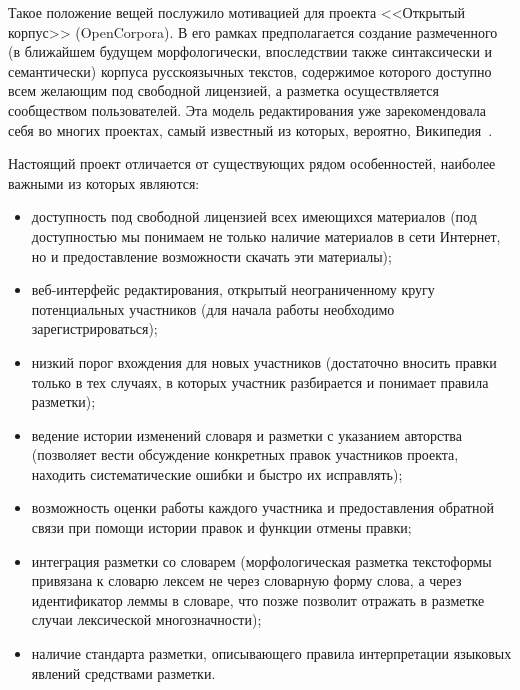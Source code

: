 \documentclass[a4paper]{article}
\begin{document}
Такое положение вещей послужило мотивацией для проекта <<Открытый корпус>> (OpenCorpora).  В его рамках предполагается создание размеченного (в ближайшем будущем морфологически, впоследствии также синтаксически и семантически) корпуса русскоязычных текстов, содержимое которого доступно всем желающим под свободной лицензией, а разметка осуществляется сообществом пользователей. Эта модель редактирования уже зарекомендовала себя во многих проектах, самый известный из которых, вероятно, Википедия~\cite{ruwiki}.

Настоящий проект отличается от существующих рядом особенностей, наиболее важными из которых являются:
\begin{itemize}
\item доступность под свободной лицензией всех имеющихся материалов (под доступностью мы понимаем не только наличие материалов в сети Интернет, но и предоставление возможности скачать эти материалы);
\item веб-интерфейс редактирования, открытый неограниченному кругу потенциальных участников (для начала работы необходимо зарегистрироваться);
\item низкий порог вхождения для новых участников (достаточно вносить правки только в тех случаях, в которых участник разбирается и понимает правила разметки);
\item ведение истории изменений словаря и разметки с указанием авторства (позволяет вести обсуждение конкретных правок участников проекта, находить систематические ошибки и быстро их исправлять);
\item возможность оценки работы каждого участника и предоставления обратной связи при помощи истории правок и функции отмены правки;
\item интеграция разметки со словарем (морфологическая разметка текстоформы привязана к словарю лексем не через словарную форму слова, а через идентификатор леммы в словаре, что позже позволит отражать в разметке случаи лексической многозначности);
\item наличие стандарта разметки, описывающего правила интерпретации языковых явлений средствами разметки.
\end{itemize}
\end{document}
